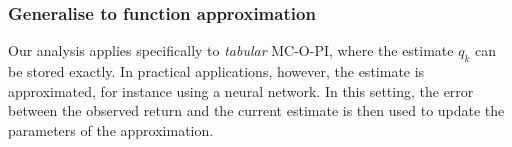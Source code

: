 







\subsubsection{Generalise to function approximation}
\label{sec: discussion function approximation}
\vspace{-0.2cm}

Our analysis applies specifically to \textit{tabular} MC-O-PI, where the estimate $q_k$ can be stored exactly.
In practical applications, however, the estimate is approximated, for instance using a neural network.
In this setting, the error between the observed return and the current estimate is then used to update the parameters of the approximation.

\vspace{-0.1cm}


